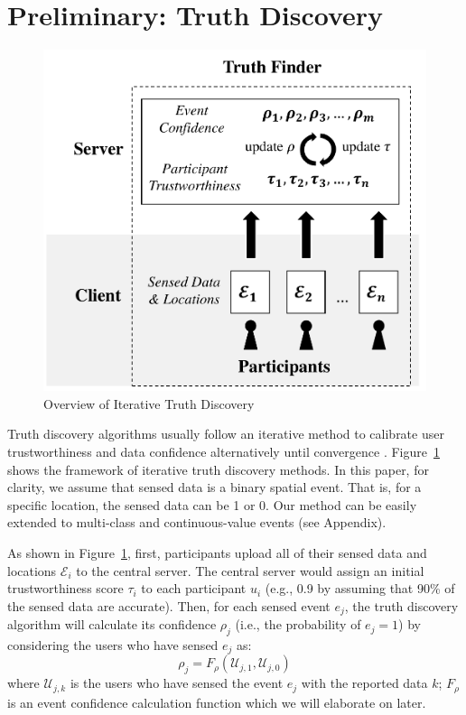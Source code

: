 \section{Preliminary: Truth Discovery}
\label{sec:preliminary}

\begin{figure}
	\centering
	\includegraphics[width=.5\linewidth]{./fig/truthfinder.pdf}
	\caption{Overview of Iterative Truth Discovery}
	\label{fig:truthfinder}
	\vspace{-1em}
\end{figure}


Truth discovery algorithms usually follow an iterative method to calibrate user trustworthiness and data confidence alternatively until convergence \citep{yin2008truth}. Figure~\ref{fig:truthfinder} shows the framework of iterative truth discovery methods. In this paper, for clarity, we assume that sensed data is a binary spatial event. That is, for a specific location, the sensed data can be 1 or 0. Our method can be easily extended to multi-class and continuous-value events (see Appendix). 

As shown in Figure~\ref{fig:truthfinder}, first, participants upload all of their sensed data and locations $\mathcal E_i$  to the central server. The central server would assign an initial trustworthiness score $\tau_i$ to each participant $u_i$ (e.g., 0.9 by assuming that 90\% of the sensed data are accurate). Then, for each sensed event $e_j$, the truth discovery algorithm will calculate its confidence $\rho_j$ (i.e., the probability of $e_j = 1$) by considering the users who have sensed $e_j$ as:
\begin{equation}
\rho_j = F_\rho(\mathcal U_{j,1}, \mathcal U_{j,0})
\label{eq:event_confidence}
\end{equation}
where $\mathcal U_{j,k}$ is the users who have sensed the event $e_j$ with the reported data $k$; $F_\rho$ is an event confidence calculation function which we will elaborate on later. 

